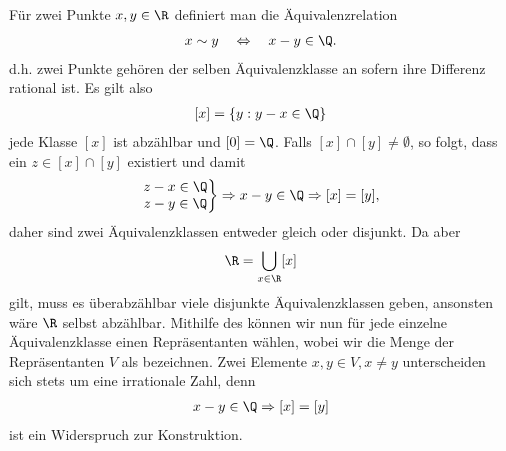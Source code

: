 \documentclass[letterpaper,10pt,english]{jupyterBook}
\begin{document}
\sphinxAtStartPar
Für zwei Punkte \(x,y\in\R\) definiert man die Äquivalenzrelation
\begin{equation*}
\begin{split}x \sim y \quad \Leftrightarrow \quad x-y \in \Q.\end{split}
\end{equation*}
\sphinxAtStartPar
d.h. zwei Punkte gehören der selben Äquivalenzklasse an sofern ihre Differenz rational ist. Es gilt also
\begin{equation*}
\begin{split}[x] = \{y: y-x\in\Q\}\end{split}
\end{equation*}
\sphinxAtStartPar
jede Klasse \([x]\) ist abzählbar und \([0] = \Q\). Falls \([x]\cap [y]\neq \emptyset\), so folgt, dass ein \(z\in[x]\cap [y]\) existiert und damit
\begin{equation*}
\begin{split}\left.
\begin{matrix}
z-x\in\Q\\
z-y\in\Q\\
\end{matrix}
\right\}
\Rightarrow x-y\in\Q\Rightarrow [x]=[y],\end{split}
\end{equation*}
\sphinxAtStartPar
daher sind zwei Äquivalenzklassen entweder gleich oder disjunkt. Da aber
\begin{equation*}
\begin{split}\R = \bigcup_{x\in\R} [x]\end{split}
\end{equation*}
\sphinxAtStartPar
gilt, muss es überabzählbar viele disjunkte Äquivalenzklassen geben, ansonsten wäre \(\R\) selbst abzählbar. Mithilfe des  können wir nun für jede einzelne Äquivalenzklasse einen Repräsentanten wählen, wobei wir die Menge der Repräsentanten \(V\) als  bezeichnen. Zwei Elemente \(x,y\in V, x\neq y\) unterscheiden sich stets um eine irrationale Zahl, denn
\begin{equation*}
\begin{split}x-y\in\Q \Rightarrow [x] = [y]\end{split}
\end{equation*}
\sphinxAtStartPar
ist ein Widerspruch zur Konstruktion.
\end{document}
